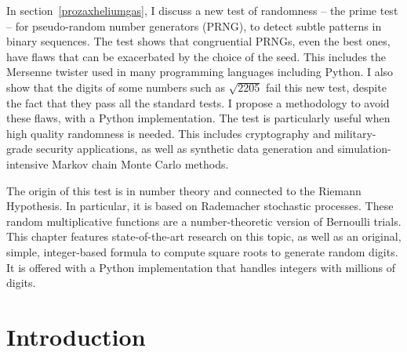 \documentclass[oneside,10pt]{book}
\begin{document}
In section~\ref{prozaxheliumgas}, I discuss a new test of randomness -- the prime test -- for pseudo-random number generators (PRNG), to detect subtle patterns in binary sequences. The test shows that congruential PRNGs, even the best ones, have flaws that can be exacerbated by the choice of the seed. This includes the Mersenne twister used in many programming languages including Python. I also show that the digits of some numbers such as $\sqrt{2205}$ fail this new test, despite the fact that they pass all the standard tests. I propose a methodology to avoid these flaws, with a Python implementation. The test is particularly useful when high quality randomness is needed. This includes cryptography and military-grade security applications, as well as
\textcolor{index}{synthetic data} generation and simulation-intensive \textcolor{index}{Markov chain Monte Carlo} methods.

The origin of this test is in number theory and connected to the Riemann
Hypothesis. In particular, it is based on Rademacher stochastic processes. These random multiplicative functions are a number-theoretic version of Bernoulli trials.  This chapter features state-of-the-art research on this topic, as well as an original, simple, integer-based formula to compute square roots to generate random digits. It is offered with a Python implementation that handles integers with millions of digits.

\hypersetup{linkcolor=red}

\section{Introduction}\label{pivizintro}
\end{document}
